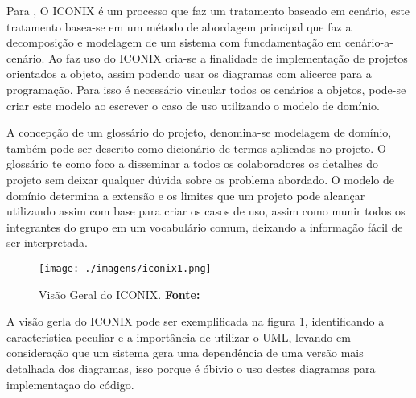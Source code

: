 \par Para , O ICONIX é um processo que faz um
tratamento baseado em cenário, este tratamento basea-se em um método de abordagem principal
que faz a decomposição e modelagem de um sistema com funcdamentação em
cenário-a-cenário. Ao faz uso do ICONIX cria-se a finalidade de implementação de
projetos orientados a objeto, assim podendo usar os diagramas com alicerce para
a programação. Para isso é necessário vincular todos os cenários a objetos,
pode-se criar este modelo ao escrever o caso de uso utilizando o modelo de
domínio.


\par A concepção de um glossário do projeto, denomina-se modelagem de domínio,
também pode ser descrito como dicionário de termos aplicados no projeto. O
glossário te como foco a disseminar a todos os colaboradores os detalhes do
projeto sem deixar qualquer dúvida sobre os problema abordado. O modelo de
domínio determina a extensão e os limites que um projeto pode alcançar
utilizando assim com base para criar os casos de uso, assim como munir todos os
integrantes do grupo em um vocabulário comum, deixando a informação fácil de ser
interpretada. 

\begin{figure}[h!]
  \centerline{\texttt{[image: ./imagens/iconix1.png]}}
  \caption[Visão Geral do ICONIX]
          {Visão Geral do ICONIX. \textbf{Fonte:} \cite{UML_Silva_Videira}}
\label{fig:exemplo1}
\end{figure}

\par A visão gerla do ICONIX pode ser exemplificada na figura 1, identificando a
característica peculiar e a importância de utilizar o UML, levando em
consideração que um sistema gera uma dependência de uma versão mais detalhada
dos diagramas, isso porque é óbivio o uso destes diagramas para implementaçao do
código.

